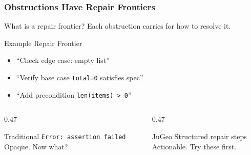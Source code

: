 \begin{frame}
\frametitle{Obstructions Have Repair Frontiers}
\begin{block}{What is a repair frontier?}
  Each obstruction carries  for how to resolve it.
\end{block}
\vspace{6pt}
\begin{exampleblock}{Example Repair Frontier}
  \begin{itemize}
    \item ``Check edge case: empty list''
    \item ``Verify base case \texttt{total=0} satisfies spec''
    \item ``Add precondition \texttt{len(items) > 0}''
  \end{itemize}
\end{exampleblock}
\vspace{6pt}
\begin{columns}[T]
\begin{column}{0.47\textwidth}
\begin{alertblock}{Traditional}
  \texttt{Error: assertion failed}\\[2pt]
  {\small Opaque. Now what?}
\end{alertblock}
\end{column}
\begin{column}{0.47\textwidth}
\begin{exampleblock}{JuGeo}
  Structured repair steps\\[2pt]
  {\small Actionable. Try these first.}
\end{exampleblock}
\end{column}
\end{columns}
\end{frame}

